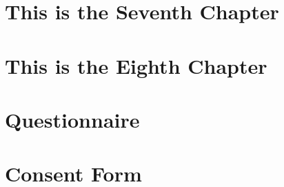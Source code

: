 \documentclass[12pt]{caltech_thesis}
\begin{document}
\chapter{This is the Seventh Chapter}
\chapter{This is the Eighth Chapter}

\printbibliography[heading=bibintoc]

\appendix

\chapter{Questionnaire}
\chapter{Consent Form}

\printindex

\theendnotes

\pocketmaterial
{} 
\end{document}
